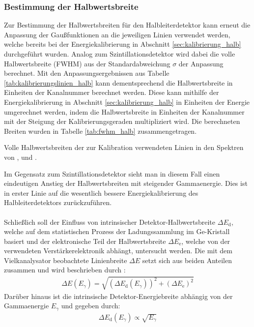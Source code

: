 \documentclass[11pt, a4paper]{article}
\numberwithin{equation}{section}
\begin{document}
\subsubsection{Bestimmung der Halbwertsbreite}
\label{sec:fwhm_halb}
Zur Bestimmung der Halbwertsbreiten für den Halbleiterdetektor kann erneut die Anpassung der Gaußfunktionen an die jeweiligen Linien verwendet werden, welche bereits bei der Energiekalibrierung in Abschnitt \ref{sec:kalibrierung_halb} durchgeführt wurden.
Analog zum Szintillationsdetektor wird dabei die volle Halbwertsbreite (FWHM) aus der Standardabweichung $\sigma$ der Anpassung berechnet.
Mit den Anpassungsergebnissen aus Tabelle \ref{tab:kalibrierungslinien_halb} kann dementsprechend die Halbwertsbreite in Einheiten der Kanalnummer berechnet werden.
Diese kann mithilfe der Energiekalibrierung in Abschnitt \ref{sec:kalibrierung_halb} in Einheiten der Energie umgerechnet werden, indem die Halbwertsbreite in Einheiten der Kanalnummer mit der Steigung der Kalibrierungsgeraden multipliziert wird.
Die berechneten Breiten wurden in Tabelle \ref{tab:fwhm_halb} zusammengetragen.
\begin{table}[ht]
	\centering
	
	\caption{Volle Halbwertsbreiten der zur Kalibration verwendeten Linien in den Spektren von ,  und .}
	\label{tab:fwhm_halb}
\end{table}
Im Gegensatz zum Szintillationsdetektor sieht man in diesem Fall einen eindeutigen Anstieg der Halbwertsbreiten mit steigender Gammaenergie.
Dies ist in erster Linie auf die wesentlich bessere Energiekalibrierung des Halbleiterdetektors zurückzuführen.\\
\\
Schließlich soll der Einfluss von intrinsischer Detektor-Halbwertsbreite $\Delta E_\mathrm{d}$, welche auf dem statistischen Prozess der Ladungssammlung im Ge-Kristall basiert \cite{anleitung} und der elektronische Teil der Halbwertsbreite $\Delta E_\mathrm{e}$, welche von der verwendeten Verstärkerelektronik abhängt, untersucht werden.
Die mit dem Vielkanalysator beobachtete Linienbreite $\Delta E$ setzt sich aus beiden Anteilen zusammen und wird beschrieben durch \cite{anleitung}:
\begin{align}
	\Delta E(E_\gamma) = \sqrt{(\Delta E_\mathrm{d}(E_\gamma))^2 + (\Delta E_\mathrm{e})^2}
\end{align}
Darüber hinaus ist die intrinsische Detektor-Energiebreite abhängig von der Gammaenergie $E_\gamma$ und gegeben durch:
\begin{align}
	\label{eq:prop_energiebreite}
	\Delta E_\mathrm{d}(E_\gamma) \propto \sqrt{E_\gamma}
\end{align}
\end{document}
